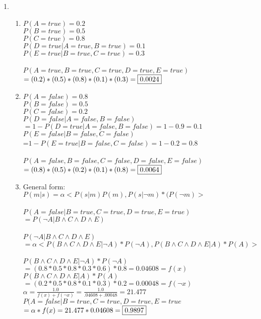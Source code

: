 \documentclass[12pt,a4paper]{report}
\begin{document}
\begin{enumerate}
\item
\begin{enumerate}
	\item
	$P(A=true)=0.2$\\
	$P(B=true)=0.5$\\
	$P(C=true)=0.8$\\
	$P(D=true | A=true, B=true)=0.1$\\
	$P(E=true|B=true, C=true)=0.3$\\ \\
	$P(A=true,B=true,C=true,D=true,E=true)$\\$=(0.2)*(0.5)*(0.8)*(0.1)*(0.3) = \fbox{0.0024}$
	\item
	$P(A=false)=0.8$\\
	$P(B=false)=0.5$\\
	$P(C=false)=0.2$\\
	$P(D=false|A=false,B=false)$\\$=1-P(D=true|A=false,B=false)=1-0.9=0.1$\\
	$P(E=false|B=false,C=false)$\\=$1-P(E=true|B=false,C=false)=1-0.2=0.8$\\ \\
	$P(A=false, B=false, C=false, D=false, E=false)$\\ $=(0.8)*(0.5)*(0.2)*(0.1)*(0.8) = \fbox{0.0064}$
	\item
	General form: $P(m|s)=\alpha <P(s|m)P(m),P(s|\neg m)*(P(\neg m)>$\\ \\
	$P(A=false|B=true,C=true,D=true,E=true)$\\$=P(\neg A| B \wedge C \wedge D \wedge E)$\\ \\
	$P(\neg A| B \wedge C \wedge D \wedge E)$\\$=\alpha <P(B \wedge C \wedge D \wedge E|\neg A)*P(\neg A),P(B \wedge C \wedge D \wedge E|A)*P(A)>$\\ \\
	$P(B \wedge C \wedge D \wedge E|\neg A)*P(\neg A)$\\$ = (0.8*0.5*0.8*0.3*0.6)*0.8 = 0.04608 = f(x)$\\
	$P(B \wedge C \wedge D \wedge E|A)*P(A) $\\$= (0.2*0.5*0.8*0.1*0.3)*0.2 = 0.00048 = f(\neg x)$\\
	$\alpha = \frac{1.0}{f(x)+f(\neg x)}=\frac{1.0}{.04608+.00048} = 21.477$\\
	$P(A=false|B=true,C=true,D=true,E=true$\\$ = \alpha * f(x) = 21.477 * 0.04608=\fbox{0.9897}$


\end{enumerate}
\end{enumerate}
\end{document}
